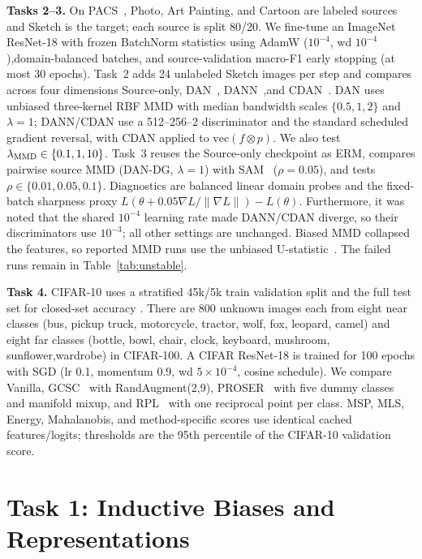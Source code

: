\documentclass{article}
\begin{document}
\textbf{Tasks 2--3.} On PACS~\cite{li2017pacs}, Photo, Art Painting, and Cartoon are labeled sources and Sketch is the target; each source is split 80/20. We fine-tune an ImageNet ResNet-18 with frozen BatchNorm statistics using AdamW ($10^{-4}$, wd $10^{-4}$),domain-balanced batches, and source-validation macro-F1 early stopping (at most 30 epochs). Task~2 adds 24 unlabeled Sketch images per step and compares across four dimensions Source-only, DAN~\cite{long2015dan}, DANN~\cite{ganin2016dann},and CDAN~\cite{long2018cdan}. DAN uses unbiased three-kernel RBF MMD with median bandwidth scales $\{0.5,1,2\}$ and $\lambda=1$; DANN/CDAN use a 512--256--2 discriminator and the standard scheduled gradient
reversal, with CDAN applied to $\mathrm{vec}(f\otimes p)$. We also test $\lambda_{\rm MMD}\in\{0.1,1,10\}$. Task~3 reuses the Source-only checkpoint as ERM, compares pairwise source MMD (DAN-DG, $\lambda=1$) with SAM~\cite{foret2021sam} ($\rho=0.05$), and tests $\rho\in\{0.01,0.05,0.1\}$. Diagnostics are balanced linear domain probes and the fixed-batch sharpness proxy
$L(\theta+0.05\nabla L/\|\nabla L\|)-L(\theta)$. Furthermore, it was noted that the shared $10^{-4}$ learning rate made DANN/CDAN diverge, so their discriminators use $10^{-3}$; all other settings are unchanged. Biased MMD collapsed the features, so reported MMD runs use the unbiased U-statistic~\cite{gretton2012mmd}. The failed runs remain in Table~\ref{tab:unstable}.

\textbf{Task 4.} CIFAR-10 uses a stratified 45k/5k train validation split and the full test set for closed-set accuracy \cite{krizhevsky2009cifar}. There are 800 unknown images each from eight near classes (bus, pickup truck, motorcycle, tractor, wolf, fox, leopard, camel) and eight far classes (bottle, bowl, chair, clock, keyboard, mushroom, sunflower,wardrobe) in CIFAR-100. A CIFAR ResNet-18 is trained for 100 epochs with SGD (lr 0.1, momentum 0.9, wd
$5\times10^{-4}$, cosine schedule). We compare Vanilla, GCSC~\cite{vaze2022osr} with RandAugment(2,9), PROSER~\cite{zhou2021proser} with five dummy classes and manifold mixup, and RPL~\cite{chen2020rpl} with one reciprocal point per class. MSP, MLS, Energy, Mahalanobis, and method-specific scores use identical cached features/logits; thresholds are the 95th percentile of the CIFAR-10 validation score.

\section{Task 1: Inductive Biases and Representations}
\end{document}
